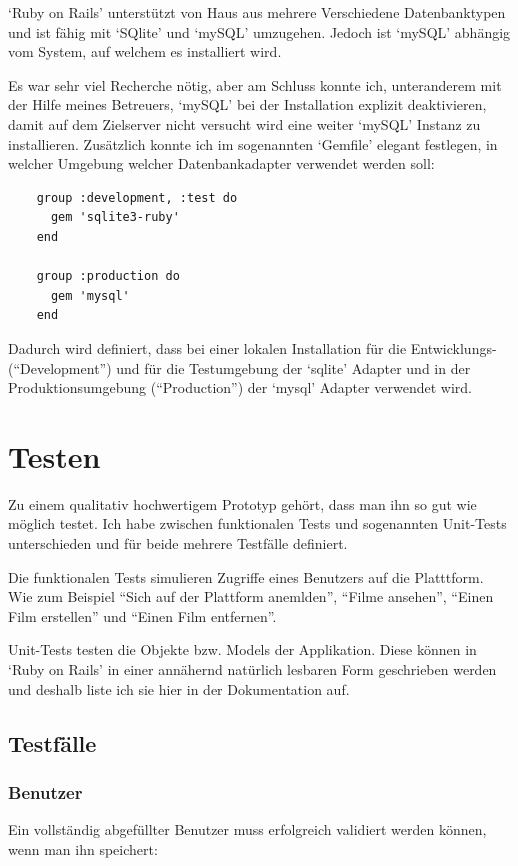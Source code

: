 `Ruby on Rails' unterstützt von Haus aus mehrere Verschiedene Datenbanktypen und
ist fähig mit `SQlite' und `mySQL' umzugehen. Jedoch ist `mySQL' abhängig vom
System, auf welchem es installiert wird.

Es war sehr viel Recherche nötig, aber am Schluss konnte ich, unteranderem mit
der Hilfe meines Betreuers, `mySQL' bei der Installation explizit deaktivieren,
damit auf dem Zielserver nicht versucht wird eine weiter `mySQL' Instanz zu
installieren. Zusätzlich konnte ich im sogenannten `Gemfile' elegant festlegen,
in welcher Umgebung welcher Datenbankadapter verwendet werden soll:

\begin{verbatim}
    group :development, :test do
      gem 'sqlite3-ruby'
    end
    
    group :production do
      gem 'mysql'
    end
\end{verbatim}

Dadurch wird definiert, dass bei einer lokalen Installation für die Entwicklungs-
(``Development'') und für die Testumgebung der `sqlite' Adapter und in der 
Produktionsumgebung (``Production'') der `mysql' Adapter verwendet wird.

\section{Testen}
Zu einem qualitativ hochwertigem Prototyp gehört, dass man ihn so gut wie 
möglich testet. Ich habe zwischen funktionalen Tests und sogenannten Unit-Tests
unterschieden und für beide mehrere Testfälle definiert.

Die funktionalen Tests simulieren Zugriffe eines Benutzers auf die Platttform.
Wie zum Beispiel ``Sich auf der Plattform anemlden'', ``Filme ansehen'', 
``Einen Film erstellen'' und ``Einen Film entfernen''.

Unit-Tests testen die Objekte bzw. Models der Applikation. Diese können in
`Ruby on Rails' in einer annähernd natürlich lesbaren Form geschrieben werden
und deshalb liste ich sie hier in der Dokumentation auf.

\subsection{Testfälle}
\subsubsection{Benutzer}
Ein vollständig abgefüllter Benutzer muss erfolgreich validiert werden können,
wenn man ihn speichert:

